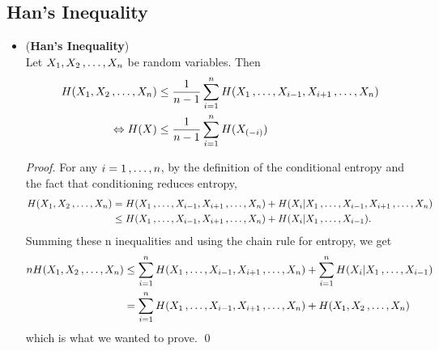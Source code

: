 \documentclass[11pt]{article}
\begin{document}
\subsection{Han's Inequality}
\begin{itemize}
\item \begin{proposition} (\textbf{Han's Inequality}) \citep{thomas2006elements, boucheron2013concentration}\\
Let $X_1, X_2 \,{,}\ldots{,}\, X_n$ be random variables. Then
\begin{align}
H(X_1, X_2 \,{,}\ldots{,}\, X_n) &\le \frac{1}{n-1}\sum_{i=1}^{n}H(X_1 \,{,}\ldots{,}\, X_{i-1}, X_{i+1} \,{,}\ldots{,}\, X_n) \label{ineqn: han_inequality} \\
\Leftrightarrow H(X) &\le \frac{1}{n-1}\sum_{i=1}^{n}H(X_{(-i)}) \nonumber
\end{align}
\end{proposition}
\begin{proof}
For any $i= 1 \,{,}\ldots{,}\, n$, by the definition of the conditional entropy and the fact that conditioning reduces entropy,
\begin{align*}
H(X_1, X_2 \,{,}\ldots{,}\, X_n) &= H(X_1 \,{,}\ldots{,}\, X_{i-1}, X_{i+1} \,{,}\ldots{,}\, X_n)  + H(X_i | X_1 \,{,}\ldots{,}\, X_{i-1}, X_{i+1} \,{,}\ldots{,}\, X_n) \\
&\le H(X_1 \,{,}\ldots{,}\, X_{i-1}, X_{i+1} \,{,}\ldots{,}\, X_n)  + H(X_i | X_1 \,{,}\ldots{,}\, X_{i-1}).
\end{align*} Summing these n inequalities and using the chain rule for entropy, we get
\begin{align*}
n H(X_1, X_2 \,{,}\ldots{,}\, X_n) &\le \sum_{i=1}^{n}H(X_1 \,{,}\ldots{,}\, X_{i-1}, X_{i+1} \,{,}\ldots{,}\, X_n) + \sum_{i=1}^{n}H(X_i | X_1 \,{,}\ldots{,}\, X_{i-1})\\
&= \sum_{i=1}^{n}H(X_1 \,{,}\ldots{,}\, X_{i-1}, X_{i+1} \,{,}\ldots{,}\, X_n) + H(X_1, X_2 \,{,}\ldots{,}\, X_n)
\end{align*} which is what we wanted to prove. \qed
\end{proof}


\end{itemize}
\end{document}
